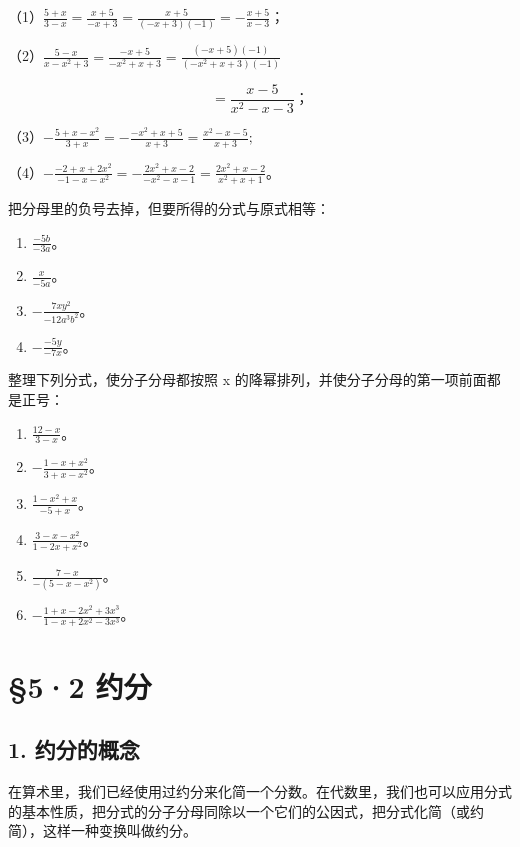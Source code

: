 
（1）\(\frac{5 + x}{3 - x} = \frac{x + 5}{-x + 3} = \frac{x + 5}{(-x + 3)(-1)} = -\frac{x + 5}{x - 3}\)；

（2）\(\frac{5 - x}{x - x^2 + 3} = \frac{-x + 5}{-x^2 + x + 3} = \frac{(-x + 5)(-1)}{(-x^2 + x + 3)(-1)}\)

\[
= \frac{x - 5}{x ^{2} - x - 3}\text{；}
\]

（3）\(-\frac{5 + x - x^2}{3 + x} = -\frac{-x^2 + x + 5}{x + 3} = \frac{x^2 - x - 5}{x + 3};\)

（4）\(-\frac{-2 + x + 2x^2}{-1 - x - x^2} = -\frac{2x^2 + x - 2}{-x^2 - x - 1} = \frac{2x^2 + x - 2}{x^2 + x + 1}\)。

把分母里的负号去掉，但要所得的分式与原式相等：

\begin{enumerate}[start=1]
\item
  \(\frac{-5b}{-3a}\)。
\item
  \(\frac{x}{-5a}\)。
\item
  \(-\frac{7xy^2}{-12a^3b^2}\)。
\item
  \(-\frac{-5y}{-7x}\)。
\end{enumerate}

整理下列分式，使分子分母都按照 x
的降幂排列，并使分子分母的第一项前面都是正号：

\begin{enumerate}[start=5]
\item
  \(\frac{12 - x}{3 - x}\)。
\item
  \(-\frac{1 - x + x^2}{3 + x - x^2}\)。
\item
  \(\frac{1 - x^2 + x}{-5 + x}\)。
\item
  \(\frac{3 - x - x^2}{1 - 2x + x^2}\)。
\item
  \(\frac{7 - x}{-(5 - x - x^2)}\)。
\item
  \(-\frac{1 + x - 2x^2 + 3x^3}{1 - x + 2x^2 - 3x^3}\)。
\end{enumerate}

\section{§5·2 约分}

\subsection{1. 约分的概念}

在算术里，我们已经使用过约分来化简一个分数。在代数里，我们也可以应用分式的基本性质，把分式的分子分母同除以一个它们的公因式，把分式化简（或约简），这样一种变换叫做约分。

